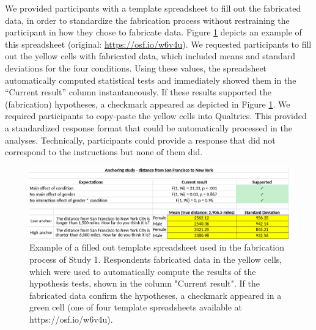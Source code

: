 \documentclass[a5paper]{book}
\begin{document}
We provided participants with a template spreadsheet to fill out the
fabricated data, in order to standardize the fabrication process without
restraining the participant in how they chose to fabricate data. Figure
\ref{fig:spreadsheet-study1} depicts an example of this spreadsheet
(original: \url{https://osf.io/w6v4u}). We requested participants to
fill out the yellow cells with fabricated data, which included means and
standard deviations for the four conditions. Using these values, the
spreadsheet automatically computed statistical tests and immediately
showed them in the \enquote{Current result} column instantaneously. If
these results supported the (fabrication) hypotheses, a checkmark
appeared as depicted in Figure \ref{fig:spreadsheet-study1}. We required
participants to copy-paste the yellow cells into Qualtrics. This
provided a standardized response format that could be automatically
processed in the analyses. Technically, participants could provide a
response that did not correspond to the instructions but none of them
did.

\begin{figure}

{\centering \includegraphics[width=1\linewidth]{./assets/figures/spreadsheet} 

}

\caption{Example of a filled out template spreadsheet used in the fabrication process of Study 1. Respondents fabricated data in the yellow cells, which were used to automatically compute the results of the hypothesis tests, shown in the column "Current result". If the fabricated data confirm the hypotheses, a checkmark appeared in a green cell (one of four template spreadsheets available at https://osf.io/w6v4u).}\label{fig:spreadsheet-study1}
\end{figure}
\end{document}
